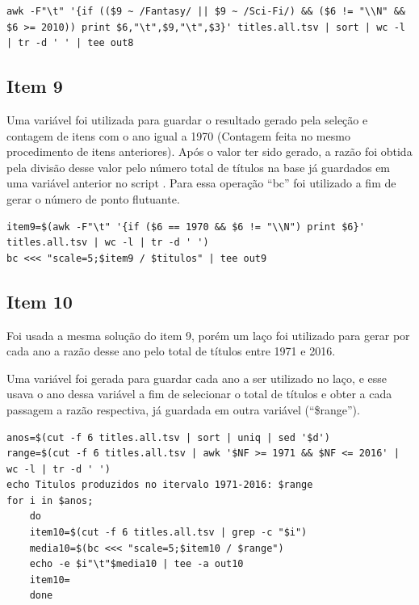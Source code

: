 \documentclass[12pt]{article}
\begin{document}
\begin{verbatim}
awk -F"\t" '{if (($9 ~ /Fantasy/ || $9 ~ /Sci-Fi/) && ($6 != "\\N" && $6 >= 2010)) print $6,"\t",$9,"\t",$3}' titles.all.tsv | sort | wc -l | tr -d ' ' | tee out8
\end{verbatim}

\subsection*{Item 9}

Uma variável foi utilizada para guardar o resultado gerado pela seleção e contagem de itens com o ano igual a 1970 (Contagem feita no mesmo procedimento de itens anteriores). Após o valor ter sido gerado, a razão foi obtida pela divisão desse valor pelo número total de títulos na base já guardados em uma variável anterior no script . Para essa operação ``bc''  foi utilizado a fim de gerar o número de ponto flutuante.

\begin{verbatim}
item9=$(awk -F"\t" '{if ($6 == 1970 && $6 != "\\N") print $6}' titles.all.tsv | wc -l | tr -d ' ')
bc <<< "scale=5;$item9 / $titulos" | tee out9
\end{verbatim}

\subsection*{Item 10}

Foi usada a mesma solução do item 9, porém um laço foi utilizado para gerar por cada ano a razão desse ano pelo total de títulos entre 1971 e 2016.

Uma variável foi gerada para guardar cada ano a ser utilizado no laço, e esse usava o ano dessa variável a fim de selecionar o total de títulos e obter a cada passagem a razão respectiva, já guardada em outra variável (``\$range'').

\begin{verbatim}
anos=$(cut -f 6 titles.all.tsv | sort | uniq | sed '$d')
range=$(cut -f 6 titles.all.tsv | awk '$NF >= 1971 && $NF <= 2016' | wc -l | tr -d ' ')
echo Titulos produzidos no itervalo 1971-2016: $range
for i in $anos;
	do
	item10=$(cut -f 6 titles.all.tsv | grep -c "$i")
	media10=$(bc <<< "scale=5;$item10 / $range")
	echo -e $i"\t"$media10 | tee -a out10
	item10=
	done
\end{verbatim}
\end{document}
